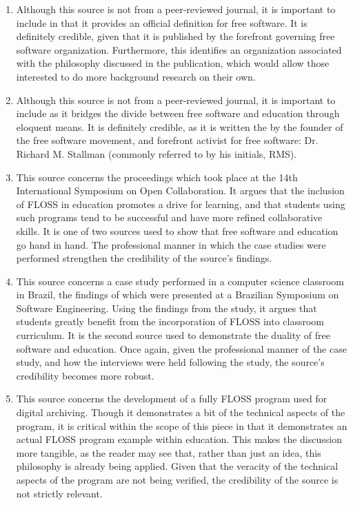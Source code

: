 \documentclass[conference]{IEEEtran}
\begin{document}
\begin{enumerate}

  \item Although this source is not from a peer-reviewed journal, it is important to include in that it provides an official definition for free software. It is definitely credible, given that it is published by the forefront governing free software organization. Furthermore, this identifies an organization associated with the philosophy discussed in the publication, which would allow those interested to do more background research on their own.

  \item Although this source is not from a peer-reviewed journal, it is important to include as it bridges the divide between free software and education through eloquent means. It is definitely credible, as it is written the by the founder of the free software movement, and forefront activist for free software: Dr. Richard M. Stallman (commonly referred to by his initials, RMS).

  \item This source concerns the proceedings which took place at the 14th International Symposium on Open Collaboration. It argues that the inclusion of FLOSS in education promotes a drive for learning, and that students using such programs tend to be successful and have more refined collaborative skills. It is one of two sources used to show that free software and education go hand in hand. The professional manner in which the case studies were performed strengthen the credibility of the source's findings.

  \item This source concerns a case study performed in a computer science classroom in Brazil, the findings of which were presented at a Brazilian Symposium on Software Engineering. Using the findings from the study, it argues that students greatly benefit from the incorporation of FLOSS into classroom curriculum. It is the second source used to demonstrate the duality of free software and education. Once again, given the professional manner of the case study, and how the interviews were held following the study, the source's credibility becomes more robust.

  \item This source concerns the development of a fully FLOSS program used for digital archiving. Though it demonstrates a bit of the technical aspects of the program, it is critical within the scope of this piece in that it demonstrates an actual FLOSS program example within education. This makes the discussion more tangible, as the reader may see that, rather than just an idea, this philosophy is already being applied. Given that the veracity of the technical aspects of the program are not being verified, the credibility of the source is not strictly relevant.


\end{enumerate}
\end{document}
